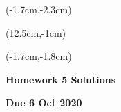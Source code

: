 \documentclass[12pt, oneside]{article}
\begin{document}
\begin{textblock*}{4cm}(-1.7cm,-2.3cm)
\end{textblock*}

\begin{textblock*}{8cm}(12.5cm,-1cm)
\end{textblock*}
\begin{textblock*}{13.5cm}(-1.7cm,-1.8cm)
\end{textblock*}

\vspace{1cm}

\begin{center}
\textbf{\Large Homework 5 Solutions}

\textbf{Due 6 Oct 2020}
\end{center}
\end{document}
